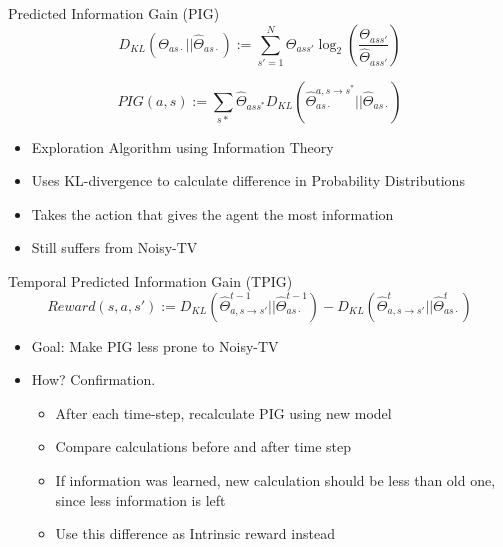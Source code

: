 	\begin{frame}[fragile]{Predicted Information Gain (PIG)}
		\[D_{KL} (\Theta_{as\cdot} || \hat{\Theta}_{as\cdot}) := \sum_{s' = 1}^{ N} \Theta_{ass'} \log_{2}(\frac{\Theta_{ass'}}{\hat{\Theta}_{ass'}})   \]
		
		\[ PIG(a,s) := \sum_{s*} \hat{\Theta}_{ass^{*}} D_{KL}(\hat{\Theta}_{as\cdot}^{a,s \rightarrow s^{*}} || \hat{\Theta}_{as\cdot}) \]
		\begin{itemize}
			\item {Exploration Algorithm using Information Theory}
			\item {Uses KL-divergence to calculate difference in Probability Distributions}
			\item {Takes the action that gives the agent the most information}
			\item {Still suffers from Noisy-TV}
		\end{itemize}
	\end{frame}
	
	\begin{frame}[fragile]{Temporal Predicted Information Gain (TPIG)}
		\[Reward(s,a,s') := D_{KL}(\hat{\Theta}_{a,s \rightarrow s'}^{t-1} || \hat{\Theta}_{as\cdot}^{t-1}) - D_{KL}(\hat{\Theta}_{a,s \rightarrow s'}^{t} || \hat{\Theta}_{as\cdot}^{t})\]
		\begin{itemize}
			\item {Goal: Make PIG less prone to Noisy-TV}
			\item {How? Confirmation.}
			\begin{itemize}
				\item {After each time-step, recalculate PIG using new model}
				\item {Compare calculations before and after time step}
				\item {If information was learned, new calculation should be less than old one, since less information is left}
				\item {Use this difference as Intrinsic reward instead}
			\end{itemize}
		\end{itemize}
	\end{frame}
	
